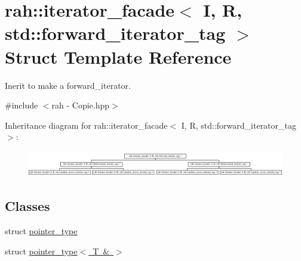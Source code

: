 \hypertarget{structrah_1_1iterator__facade_3_01_i_00_01_r_00_01std_1_1forward__iterator__tag_01_4}{}\section{rah\+::iterator\+\_\+facade$<$ I, R, std\+::forward\+\_\+iterator\+\_\+tag $>$ Struct Template Reference}
\label{structrah_1_1iterator__facade_3_01_i_00_01_r_00_01std_1_1forward__iterator__tag_01_4}


Inerit to make a forward\+\_\+iterator.  




{\ttfamily \#include $<$rah -\/ Copie.\+hpp$>$}

Inheritance diagram for rah\+::iterator\+\_\+facade$<$ I, R, std\+::forward\+\_\+iterator\+\_\+tag $>$\+:\begin{figure}[H]
\begin{center}
\leavevmode
\includegraphics[height=1.147541cm]{structrah_1_1iterator__facade_3_01_i_00_01_r_00_01std_1_1forward__iterator__tag_01_4}
\end{center}
\end{figure}
\subsection*{Classes}
\begin{DoxyCompactItemize}
\item 
struct \mbox{\hyperlink{structrah_1_1iterator__facade_3_01_i_00_01_r_00_01std_1_1forward__iterator__tag_01_4_1_1pointer__type}{pointer\+\_\+type}}
\item 
struct \mbox{\hyperlink{structrah_1_1iterator__facade_3_01_i_00_01_r_00_01std_1_1forward__iterator__tag_01_4_1_1pointer__type_3_01_t_01_6_01_4}{pointer\+\_\+type$<$ T \& $>$}}
\end{DoxyCompactItemize}
